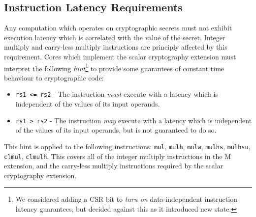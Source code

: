 
\subsection{Instruction Latency Requirements}
\label{sec:scalar:timing}

Any computation which operates on cryptographic secrets must not
exhibit execution latency which is correlated with the value of the
secret.
Integer multiply and carry-less multiply instructions are principly affected
by this requirement.
Cores which implement the scalar cryptography
extension must interpret the following {\em hint}\footnote{
We considered adding a CSR bit to {\em turn on} data-independent instruction
latency guarantees, but decided against this as it introduced new state.
} to provide some
guarantees of constant time behaviour to cryptographic code:

\begin{itemize}
\item {\tt rs1 <= rs2} - 
    The instruction {\em must} execute with a latency which is
    independent of the values of its input operands.
\item {\tt rs1  > rs2} - 
    The instruction {\em may} execute with a latency which is
    independent of the values of its input operands, but is not
    guaranteed to do so.
\end{itemize}

This hint is applied to the following instructions:
{\tt mul},
{\tt mulh},
{\tt mulw},
{\tt mulhs},
{\tt mulhsu},
{\tt clmul},
{\tt clmulh}.
This covers all of the integer multiply instructions in the
M extension, and the carry-less multiply instructions required by the
scalar cryptography extension.


